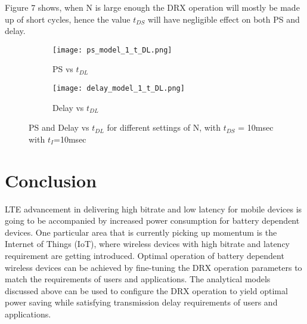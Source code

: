 \documentclass[8pt]{article}
\begin{document}
\newpage

Figure 7 shows, when N is large enough the DRX operation will mostly be made up of short cycles, hence the value \(t_{DS}\) will have negligible effect on both PS and delay.

\begin{figure}[h!]
\centering
\begin{subfigure}{.5\textwidth}
  \centering
  \texttt{[image: ps\_model\_1\_t\_DL.png]}
  \caption{ PS vs \(t_{DL}\)}
  \label{fig:sub1}
\end{subfigure}%
\begin{subfigure}{.5\textwidth}
  \centering
  \texttt{[image: delay\_model\_1\_t\_DL.png]}
  \caption{Delay vs \(t_{DL}\) }
  \label{fig:sub2}
\end{subfigure}
\caption{PS and Delay vs  \(t_{DL}\) for different settings of N, with \(t_{DS}\) = 10msec with \(t_{I}\)=10msec}
\label{fig:test}
\end{figure}

\section*{Conclusion}

LTE advancement in delivering high bitrate and low latency for mobile devices is going to be accompanied by increased power consumption for battery dependent devices. One particular area that is currently picking up momentum is the Internet of Things (IoT), where wireless devices with high bitrate and latency requirement are getting introduced.  Optimal operation of battery dependent wireless devices can be achieved by fine-tuning the DRX operation parameters to match the requirements of users and applications. The analytical models discussed above can be used to configure the DRX operation to yield optimal power saving while satisfying transmission delay requirements of users and applications. 


\nocite{*}



\newpage
\vspace{5mm}


%
\end{document}
